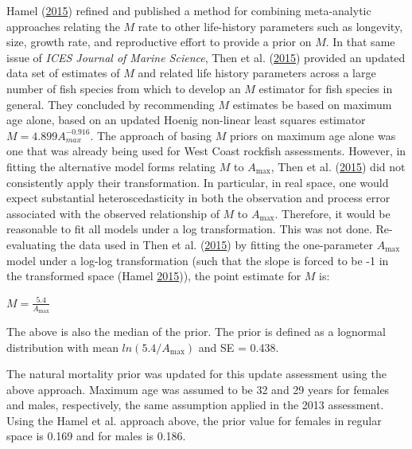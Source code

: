 \documentclass[12pt,]{article}
\begin{document}
Hamel (\protect\hyperlink{ref-hamel_method_2015}{2015}) refined and
published a method for combining meta-analytic approaches relating the
\(M\) rate to other life-history parameters such as longevity, size,
growth rate, and reproductive effort to provide a prior on \(M\). In
that same issue of \emph{ICES Journal of Marine Science}, Then et al.
(\protect\hyperlink{ref-then_evaluating_2015}{2015}) provided an updated
data set of estimates of \(M\) and related life history parameters
across a large number of fish species from which to develop an \(M\)
estimator for fish species in general. They concluded by recommending
\(M\) estimates be based on maximum age alone, based on an updated
Hoenig non-linear least squares estimator \(M=4.899A^{-0.916}_{max}\).
The approach of basing \(M\) priors on maximum age alone was one that
was already being used for West Coast rockfish assessments. However, in
fitting the alternative model forms relating \(M\) to
\(A_{\text{max}}\), Then et al.
(\protect\hyperlink{ref-then_evaluating_2015}{2015}) did not
consistently apply their transformation. In particular, in real space,
one would expect substantial heteroscedasticity in both the observation
and process error associated with the observed relationship of \(M\) to
\(A_{\text{max}}\). Therefore, it would be reasonable to fit all models
under a log transformation. This was not done. Re-evaluating the data
used in Then et al. (\protect\hyperlink{ref-then_evaluating_2015}{2015})
by fitting the one-parameter \(A_{\text{max}}\) model under a log-log
transformation (such that the slope is forced to be -1 in the
transformed space (Hamel
\protect\hyperlink{ref-hamel_method_2015}{2015})), the point estimate
for \(M\) is:

\begin{centering}

$M=\frac{5.4}{A_{\text{max}}}$

\end{centering}

The above is also the median of the prior. The prior is defined as a
lognormal distribution with mean \(ln(5.4/A_{\text{max}})\) and SE =
0.438.

The natural mortality prior was updated for this update assessment using
the above approach. Maximum age was assumed to be 32 and 29 years for
females and males, respectively, the same assumption applied in the 2013
assessment. Using the Hamel et al. approach above, the prior value for
females in regular space is 0.169 and for males is 0.186.
\end{document}
